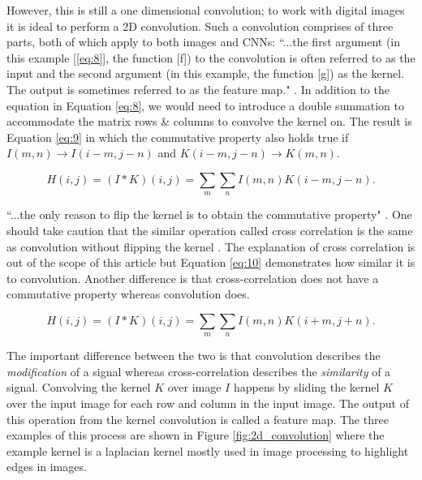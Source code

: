 \documentclass[report, 11pt, oneside]{dissertation}
\begin{document}
However, this is still a one dimensional convolution; to work with digital images it is ideal to perform a 2D convolution. Such a convolution comprises of three parts, both of which apply to both images and CNNs: ``...the first argument (in this example [\ref{eq:8}], the function [f]) to the convolution is often referred to as the input and the second argument (in this example, the function [g]) as the kernel. The output is sometimes referred to as the feature map." \citep[322-323]{Goodfellow-et-al-2016}. In addition to the equation in Equation \ref{eq:8}, we would need to introduce a double summation to accommodate the matrix rows \& columns to convolve the kernel on. The result is Equation \ref{eq:9} in which the commutative property also holds true if $ I(m,n) \rightarrow I(i-m, j-n)  $ and $ K(i-m, j-n) \rightarrow K(m,n) $.

\begin{equation} \label{eq:9}
	H(i,j) = (I * K)(i,j) = \sum_{m} \sum_{n} I(m,n)K(i-m, j-n).
\end{equation}

 ``...the only reason to flip the kernel is to obtain the commutative property" \citep[323]{Goodfellow-et-al-2016}. One should take caution that the similar operation called cross correlation is the same as convolution without flipping the kernel \citep[324]{Goodfellow-et-al-2016}. The explanation of cross correlation is out of the scope of this article but Equation \ref{eq:10} demonstrates how similar it is to convolution. Another difference is that cross-correlation does not have a commutative property whereas convolution does.
 
 \begin{equation} \label{eq:10}
	H(i,j) = (I * K)(i,j) = \sum_{m} \sum_{n} I(m,n)K(i+m, j+n).
\end{equation}

  The important difference between the two is that convolution describes the \textit{ modification} of a signal whereas cross-correlation describes the \textit{similarity} of a signal. Convolving the kernel $ K $ over image $ I $ happens by sliding the kernel $ K $ over the input image for each row and column in the input image. The output of this operation from the kernel convolution is called a feature map. The three examples of this process are shown in Figure \ref{fig:2d_convolution} where the example kernel is a laplacian kernel mostly used in image processing to highlight edges in images.
\end{document}
